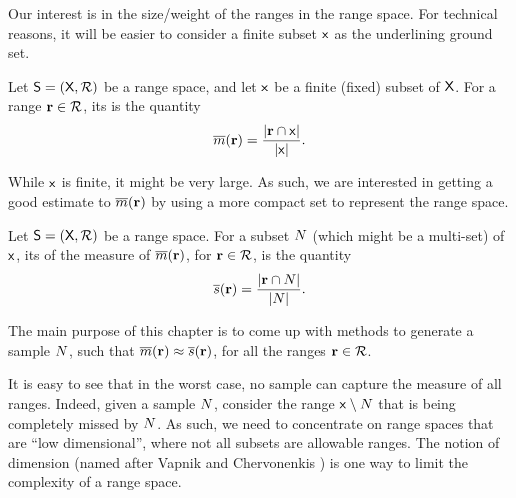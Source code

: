 Our interest is in the size/weight of the ranges in the range
space. For technical reasons, it will be easier to consider a finite
subset $\mathsf{x}$ as the underlining ground set.

\begin{defn}
    Let $\mathsf{S} = (\textsf{X},{\mathcal{R}})$ be a range space, and
    let $\mathsf{x}$ be a finite (fixed) subset of $\textsf{X}$. For
    a range $\mathbf{r} \in {\mathcal{R}}$, its  is the
    quantity
    \begin{equation*}
        \Measure{\range}%
        =%
        \frac{\cardin{\range \cap \FGroundSet}}{\cardin{\FGroundSet}}.
    \end{equation*}
\end{defn}

While $\mathsf{x}$ is finite, it might be very large. As such, we are
interested in getting a good estimate to $\Measure{\range}$ by using a
more compact set to represent the range space.

\begin{defn}
    Let $\mathsf{S} = (\textsf{X},{\mathcal{R}})$ be a range space.  For
    a subset $N$ (which might be a multi-set) of $\mathsf{x}$,
    its  of the measure of $\Measure{\range}$, for
    $\mathbf{r} \in {\mathcal{R}}$, is the quantity
    \begin{align*}
      \sMeasure{\range}%
      =%
      \frac{\cardin{\range \cap \SetC}}{\cardin{\SetC}}.
    \end{align*}
\end{defn}

The main purpose of this chapter is to come up with methods to
generate a sample $N$, such that $\Measure{\range} \approx
\sMeasure{\range}$, for all the ranges $\mathbf{r} \in {\mathcal{R}}$.

It is easy to see that in the worst case, no sample can capture the
measure of all ranges.  Indeed, given a sample $N$, consider the
range $\mathsf{x} \setminus N$ that is being completely missed by
$N$.  As such, we need to concentrate on range spaces that are
``low dimensional'', where not all subsets are allowable ranges. The
notion of \VC dimension (named after Vapnik and Chervonenkis
\cite{vc-ucrfe-71}) is one way to limit the complexity of a range
space.


